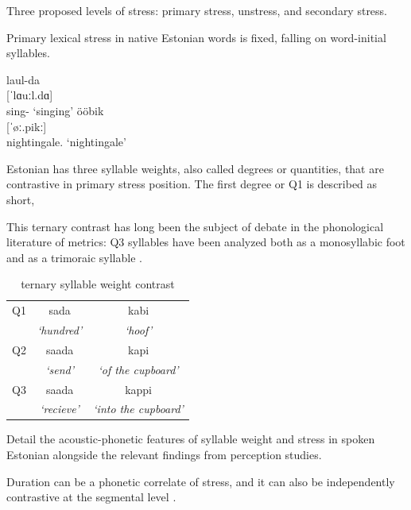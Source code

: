Three proposed levels of stress: primary stress, unstress, and secondary stress. \citep{lippusAcousticStudyEstonian2014a}

Primary lexical stress in native Estonian words is fixed, falling on word-initial syllables. 
\cite{eekmeisterUralica98}
\begin{exe}
\ex \gll laul-da \\
	{[ˈlɑuːl.dɑ]} \\
	sing-\Tr{} 
	\glt	`singing'
\ex 	ööbik \\
	{[ˈøː.pikː]} \\
	nightingale.\Nom{} 
	\glt`nightingale'
\end{exe}

Estonian has three syllable weights, also called degrees or quantities, that are contrastive in primary stress position. The first degree or Q1 is described as short, 

This ternary contrast has long been the subject of debate in the phonological literature of metrics: Q3 syllables have been analyzed both as a monosyllabic foot \citep{princeMetricalTheoryEstonian1980} and as a trimoraic syllable \citep{hayesCompensatoryLengtheningMoraic1989, kuznetsovaEstonianWordProsody2018,prillopMoraeEstonianReply2020}. 


 \begin{table}[htb]
\centering
\begin{tabular}{lcc}
\hline

Q1 &		 sada 		& 	kabi  \\  
	&	 {\it `hundred'} 	&	 {\it`hoof' }\\
\hline
Q2 &		saada 		&	kapi \\
	&	 {\it`send' }		&	{\it`of the cupboard' }		\\
\hline
Q3 &		saada 	&	 kappi 	\\
	&	{\it`recieve' }	&	{\it`into the cupboard' }	\\
\hline
\end{tabular}
\label{qexamps}
\caption{ternary syllable weight contrast}
\end{table}


Detail the acoustic-phonetic features of syllable weight and stress in spoken Estonian alongside the relevant findings from perception studies. 
 





Duration can be a phonetic correlate of stress, and it can also be independently contrastive at the segmental level \citep{lehistePhoneticsMetrics1992}. 


